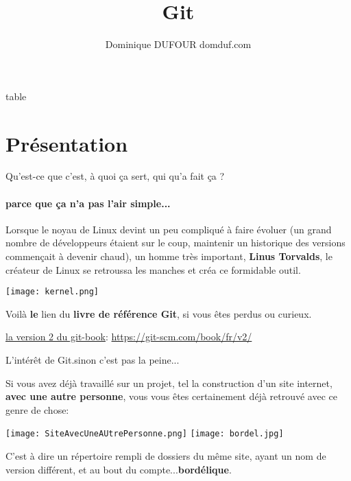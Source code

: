 \documentclass[10pt]{beamer}
\author{Dominique DUFOUR domduf.com}
\title{Git}
\begin{document}
\begin{frame}
\titlepage
\end{frame}

\begin{frame}{table}
\tableofcontents
\end{frame}

\section{Présentation}

\begin{frame}{Qu'est-ce que c'est, à quoi ça sert, qui qu'a fait ça ?}

\framesubtitle{parce que ça n'a pas l'air simple...}

Lorsque le noyau de Linux devint un peu compliqué à faire évoluer (un grand nombre de développeurs étaient sur le coup, maintenir un historique des versions commençait à devenir chaud), un homme très important, \textbf{Linus Torvalds}, le créateur de Linux se retroussa les manches et créa ce formidable outil.

\begin{center}
\texttt{[image: kernel.png]}
\end{center}

Voilà \textbf{le} lien du \textbf{livre de référence Git}, si vous êtes perdus ou curieux.

\href{https://git-scm.com/book/fr/v2/}{la version 2 du git-book}: \url{https://git-scm.com/book/fr/v2/}



\end{frame}



\begin{frame}{L'intérêt de Git.}{sinon c'est pas la peine...}

Si vous avez déjà travaillé sur un projet, tel la construction d'un site internet, \textbf{avec une autre personne}, vous vous êtes 
certainement déjà retrouvé avec ce genre de chose:

\texttt{[image: SiteAvecUneAUtrePersonne.png]} \texttt{[image: bordel.jpg]}

C'est à dire un répertoire rempli de dossiers du même site, ayant un nom de version différent, et au bout du compte...\textbf{bordélique}.

\end{frame}
\end{document}
